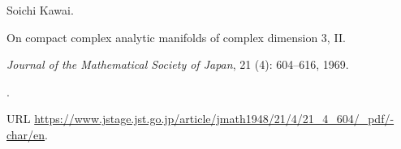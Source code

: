 Soichi Kawai.

\newblock On compact complex analytic manifolds of complex dimension 3, {II}.

\newblock \emph{Journal of the Mathematical Society of Japan}, 21
  (4): 604--616, 1969.

\newblock {}.

\newblock URL
  \url{https://www.jstage.jst.go.jp/article/jmath1948/21/4/21_4_604/_pdf/-char/en}.